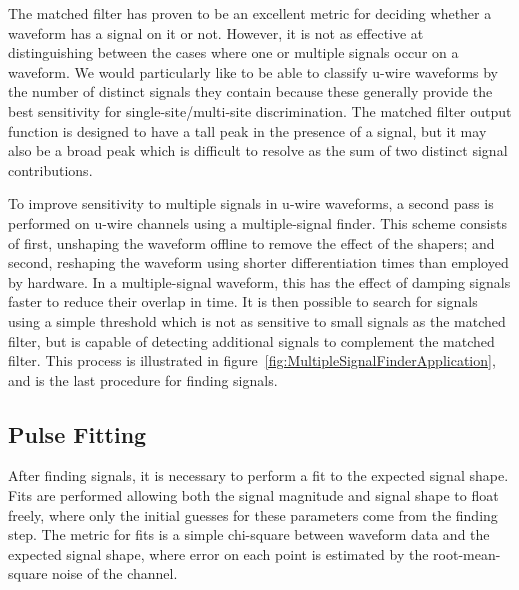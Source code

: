 The matched filter has proven to be an excellent metric for deciding whether a waveform has a signal on it or not.  However, it is not as effective at distinguishing between the cases where one or multiple signals occur on a waveform.  We would particularly like to be able to classify u-wire waveforms by the number of distinct signals they contain because these generally provide the best sensitivity for single-site/multi-site discrimination.  The matched filter output function is designed to have a tall peak in the presence of a signal, but it may also be a broad peak which is difficult to resolve as the sum of two distinct signal contributions.

To improve sensitivity to multiple signals in u-wire waveforms, a second pass is performed on u-wire channels using a multiple-signal finder.  This scheme consists of first, unshaping the waveform offline to remove the effect of the shapers; and second, reshaping the waveform using shorter differentiation times than employed by hardware.  In a multiple-signal waveform, this has the effect of damping signals faster to reduce their overlap in time.  It is then possible to search for signals using a simple threshold which is not as sensitive to small signals as the matched filter, but is capable of detecting additional signals to complement the matched filter.  This process is illustrated in figure~\ref{fig:MultipleSignalFinderApplication}, and is the last procedure for finding signals.~\cite{ReconstructionDocument}

\subsection{Pulse Fitting}\label{sec:ReconPulseFitting}

After finding signals, it is necessary to perform a fit to the expected signal shape.  Fits are performed allowing both the signal magnitude and signal shape to float freely, where only the initial guesses for these parameters come from the finding step.  The metric for fits is a simple chi-square between waveform data and the expected signal shape, where error on each point is estimated by the root-mean-square noise of the channel.

